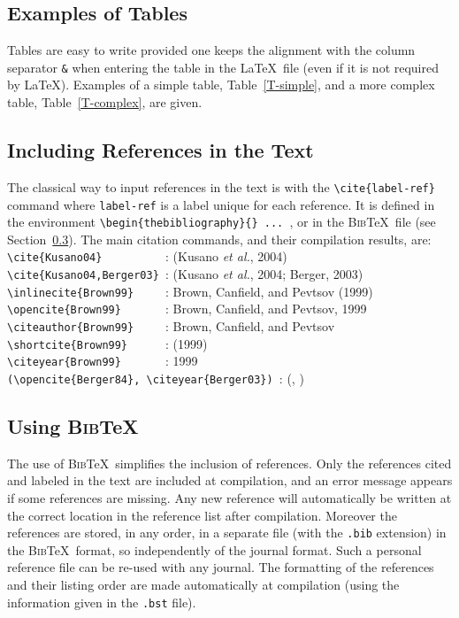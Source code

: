 \documentclass[namedreferences]{solarphysics}
\newcommand{\BibTeX}{\textsc{Bib}\TeX}
\newcommand{\etal}{{\it et al.}}
\begin{document}
\begin{article}
{\subsection{Examples of Tables} %
  \label{S-tables}
   Tables are easy to write provided one keeps the alignment 
with the column separator \texttt{\&} when entering the table 
in the \LaTeX\ file 
(even if it is not required by \LaTeX). Examples of a simple table,
Table~\ref{T-simple}, and a more complex table, Table~\ref{T-complex},
are given.

\subsection{Including References in the Text} %
  \label{S-references}
  The classical way to input references in the text is with the 
\verb+\cite{label-ref}+ command where \verb+label-ref+ is a label
unique for each reference.  It is defined in the environment
\verb+\begin{thebibliography}{} ... +, or in the \BibTeX\ file
(see Section~\ref{S-BibTeX}). The main citation commands, and their
compilation results, are:\\
\verb+\cite{Kusano04}          +: (Kusano \etal, 2004)\\
\verb+\cite{Kusano04,Berger03} +: (Kusano \etal, 2004; Berger, 2003)\\
\verb+\inlinecite{Brown99}     +: Brown, Canfield, and Pevtsov (1999)\\
\verb+\opencite{Brown99}       +: Brown, Canfield, and Pevtsov, 1999\\
\verb+\citeauthor{Brown99}     +: Brown, Canfield, and Pevtsov\\
\verb+\shortcite{Brown99}      +: (1999)\\
\verb+\citeyear{Brown99}       +: 1999\\
\verb+(\opencite{Berger84}, \citeyear{Berger03}) +: 
                                  (, \citeyear{Berger03})
   
\subsection{Using \BibTeX} %
  \label{S-BibTeX}
  The use of \BibTeX\ simplifies the inclusion of references. Only the 
references cited and labeled in the text are included at compilation, 
and an error message appears if some references
are missing.  Any new reference will automatically be written at the correct 
location in the reference list after compilation. 
Moreover the references are stored, in any order, in a separate file
(with the \texttt{.bib} extension) in the \BibTeX\ format, so independently of 
the journal format. Such a personal reference file can be re-used with any journal.
The formatting of the references and their listing order are made automatically
at compilation (using the information given in the \texttt{.bst} file). 
        
}
\end{article}
\end{document}
